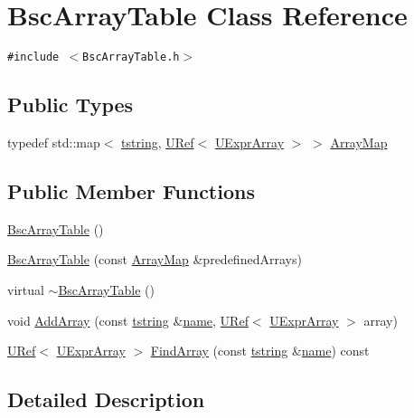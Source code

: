 \hypertarget{class_bsc_array_table}{
\section{BscArrayTable Class Reference}
\label{class_bsc_array_table}
}
{\tt \#include $<$BscArrayTable.h$>$}

\subsection*{Public Types}
\begin{CompactItemize}
\item 
typedef std::map$<$ \hyperlink{common__afx_8h_816fa58fd77499b0edb2c69ebe803d5c}{tstring}, \hyperlink{class_u_ref}{URef}$<$ \hyperlink{class_u_expr_array}{UExprArray} $>$ $>$ \hyperlink{class_bsc_array_table_ad9ddb45d7f02f4e818990937836f023}{ArrayMap}
\end{CompactItemize}
\subsection*{Public Member Functions}
\begin{CompactItemize}
\item 
\hyperlink{class_bsc_array_table_b917923a99d9d67f05d2120768ab4784}{BscArrayTable} ()
\item 
\hyperlink{class_bsc_array_table_43338bfae210ff47eac4ada4e25fd10b}{BscArrayTable} (const \hyperlink{class_bsc_array_table_ad9ddb45d7f02f4e818990937836f023}{ArrayMap} \&predefinedArrays)
\item 
virtual \hyperlink{class_bsc_array_table_d3529b253fbeee28f0bf3f7340341c7c}{$\sim$BscArrayTable} ()
\item 
void \hyperlink{class_bsc_array_table_38b2c7ac150c6ce1dab65c0a2387c0de}{AddArray} (const \hyperlink{common__afx_8h_816fa58fd77499b0edb2c69ebe803d5c}{tstring} \&\hyperlink{glext__bak_8h_bb62efe59ccdd153ce42e1a418352209}{name}, \hyperlink{class_u_ref}{URef}$<$ \hyperlink{class_u_expr_array}{UExprArray} $>$ array)
\item 
\hyperlink{class_u_ref}{URef}$<$ \hyperlink{class_u_expr_array}{UExprArray} $>$ \hyperlink{class_bsc_array_table_2d3220ea99c7cad6720dbb1395bfd879}{FindArray} (const \hyperlink{common__afx_8h_816fa58fd77499b0edb2c69ebe803d5c}{tstring} \&\hyperlink{glext__bak_8h_bb62efe59ccdd153ce42e1a418352209}{name}) const 
\end{CompactItemize}


\subsection{Detailed Description}


